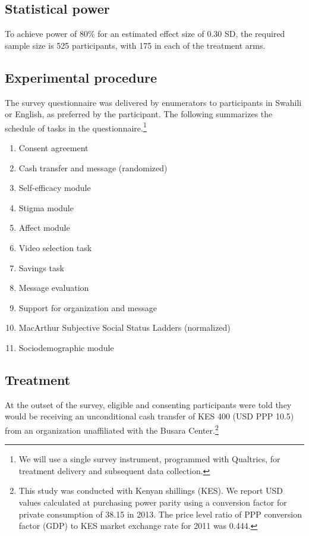 \documentclass[11pt, a4paper]{article}\usepackage[]{graphicx}\usepackage[]{color}
\begin{document}
    \subsection{Statistical power}

        To achieve power of 80\% for an estimated effect size of 0.30 SD, the required sample size is 525 participants, with 175 in each of the treatment arms.

    \subsection{Experimental procedure}

        The survey questionnaire was delivered by enumerators to participants in Swahili or English, as preferred by the participant. The following summarizes the schedule of tasks in the questionnaire.\footnote{We will use a single survey instrument, programmed with Qualtrics, for treatment delivery and subsequent data collection.}

        \begin{enumerate}
        \itemsep0em
            \item Consent agreement
            \item Cash transfer and message (randomized)
            \item Self-efficacy module
            \item Stigma module
            \item Affect module
            \item Video selection task
            \item Savings task
            \item Message evaluation
            \item Support for organization and message
            \item MacArthur Subjective Social Status Ladders (normalized)
            \item Sociodemographic module
        \end{enumerate}

    \subsection{Treatment}

        At the outset of the survey, eligible and consenting participants were told they would be receiving an unconditional cash transfer of KES 400 (USD PPP 10.5) from an organization unaffiliated with the Busara Center.\footnote{This study was conducted with Kenyan shillings (KES). We report USD values calculated at purchasing power parity using a conversion factor for private consumption of 38.15 in 2013. The price level ratio of PPP conversion factor (GDP) to KES market exchange rate for 2011 was 0.444.} \\
\end{document}
